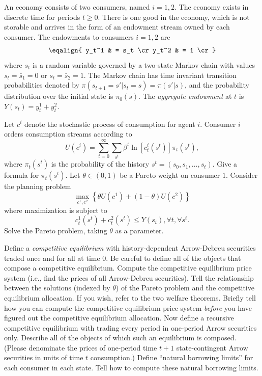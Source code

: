 \medskip
{} \quad
\medskip
\noindent  An economy consists of two consumers, named $i=1,2$.
The economy exists in discrete time  for periods $t \geq 0$.
There is one good in the economy, which is not storable and
arrives in the form of an endowment stream owned by each consumer.
The endowments to consumers $i=1,2$ are
$$\eqalign{ y_t^1 & = s_t \cr
            y_t^2 & = 1 \cr }  $$
where $s_t$ is a random variable governed by a two-state Markov
chain with values $s_t = \bar s_1 = 0$ or  $s_t  = \bar s_2 = 1 $.
The Markov chain  has time invariant transition probabilities
denoted by $\pi(s_{t+1} =  s' | s_t = s) = \pi(s'|s)$, and the
probability distribution over the initial  state is $\pi_0(s)$.
The {\it aggregate endowment} at $t$ is $Y(s_t) = y_t^1 + y_t^2$.


   Let $c^i$ denote the stochastic
process of consumption for agent $i$.
  Consumer $i$ orders consumption streams according to
$$ U(c^i)= \sum_{t=0}^\infty \sum_{s^t}  \beta^t \ln [c_t^i(s^t)]
 \pi_t (s^t),  $$
where $\pi_t(s^t)$ is the probability of the history $s^t = (s_0,
s_1, \ldots , s_t)$.
\medskip
{}  Give a formula for $\pi_t(s^t)$.
\medskip
{}  Let $\theta \in (0,1)$ be a Pareto weight on
consumer $1$.  Consider the     planning problem
$$ \max_{c^1, c^2} \left\{ \theta U(c^1) + (1-\theta) U(c^2)
  \right\}  $$
where  maximization is subject to
$$ c_t^1(s^t) + c_t^2(s^t) \leq Y(s_t) , \forall t, \forall s^t . $$
Solve the Pareto problem, taking $\theta$ as a parameter.
\medskip

   Define a {\it competitive equilibrium} with
history-dependent Arrow-Debreu  securities traded once and for all
at time $0$.  Be careful to define all of the objects that compose
a competitive equilibrium.
\medskip
{}   Compute the competitive equilibrium price
system (i.e., find the prices of all  Arrow-Debreu
securities).
\medskip
{}    Tell the relationship between the solutions
(indexed by $\theta$) of the Pareto problem  and the competitive
equilibrium allocation.  If you wish, refer to the two welfare
theorems.
\medskip
{}  Briefly tell how you can compute the
competitive equilibrium price system {\it before} you have figured
out the competitive equilibrium allocation.
\medskip
{}   Now define a recursive  competitive
equilibrium with trading every period in one-period Arrow
securities only.   Describe all of the objects of which such an
equilibrium is composed. (Please denominate the prices of
one-period time $t+1$ state-contingent
 Arrow securities in units of time $t$ consumption.)
   Define
 ``natural borrowing limits'' for each consumer in each state.
Tell how to compute these natural borrowing limits.

